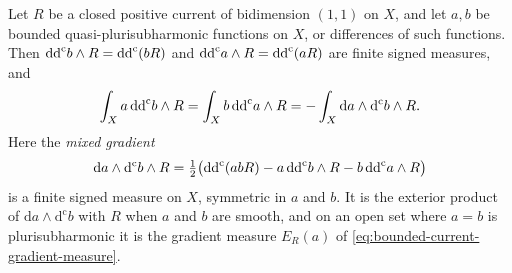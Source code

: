 \begin{lemma}\label{lem:bounded-global-integration-by-parts}
Let $R$ be a closed positive current of bidimension $(1,1)$ on $X$, and let $a,b$ be bounded quasi-plurisubharmonic functions on $X$, or differences of such functions. Then $\mathrm{dd}^{\mathrm{c}} b\wedge R=\mathrm{dd}^{\mathrm{c}}(bR)$ and $\mathrm{dd}^{\mathrm{c}} a\wedge R=\mathrm{dd}^{\mathrm{c}}(aR)$ are finite signed measures, and
\[
 \int_X a\,\mathrm{dd}^{\mathrm{c}} b\wedge R
   =\int_X b\,\mathrm{dd}^{\mathrm{c}} a\wedge R
   =-\int_X\mathrm da\wedge\mathrm d^{\mathrm c}b\wedge R.
\]
Here the \emph{mixed gradient}
\[
 \mathrm da\wedge\mathrm d^{\mathrm c}b\wedge R=\tfrac12\bigl(\mathrm{dd}^{\mathrm{c}}(abR)-a\,\mathrm{dd}^{\mathrm{c}} b\wedge R-b\,\mathrm{dd}^{\mathrm{c}} a\wedge R\bigr)
\]
is a finite signed measure on $X$, symmetric in $a$ and $b$. It is the exterior product of $\mathrm da\wedge\mathrm d^{\mathrm c}b$ with $R$ when $a$ and $b$ are smooth, and on an open set where $a=b$ is plurisubharmonic it is the gradient measure $E_R(a)$ of \eqref{eq:bounded-current-gradient-measure}.
\end{lemma}
